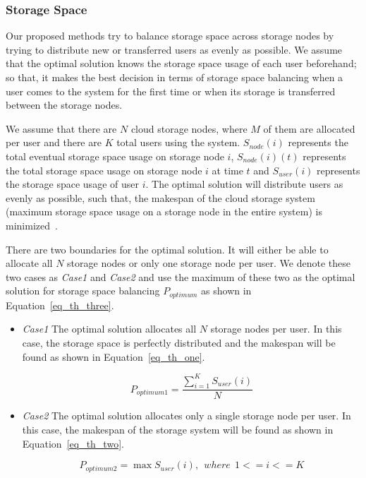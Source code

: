 \documentclass[preprint,12pt]{elsarticle}
\begin{document}
\subsubsection{Storage Space}
Our proposed methods try to balance storage space across storage nodes by trying to
distribute new or transferred users as evenly as possible. We assume that the optimal solution
knows the storage space usage of each user beforehand; so that, it makes the best decision in 
terms of storage space balancing when a user comes to the system for the first time or when its
storage is transferred between the storage nodes.

We assume that there are $N$ cloud storage nodes, where $M$ of them are allocated per user and
there are $K$ total users using the system. $S_{node}(i)$ represents the total eventual storage space
usage on storage node $i$, $S_{node}(i)(t)$ represents the total storage space usage
on storage node $i$ at time $t$ and $S_{user}(i)$ represents the storage space usage of user $i$. The optimal
solution will distribute users as evenly as possible, such that, the makespan of the cloud storage
system (maximum storage space usage on a storage node in the entire system) is minimized~\cite{tu_lecture}.

There are two boundaries for the optimal solution. It will either be able to allocate all $N$
storage nodes or only one storage node per user. We denote these two cases as \textit{Case1}
and \textit{Case2} and use the maximum of these two as the optimal solution for storage space balancing
$P_{optimum}$ as shown in Equation~\eqref{eq_th_three}.

\begin{itemize}
\item \textit{Case1} The optimal solution allocates all $N$ storage nodes per user. In this case,
the storage space is perfectly distributed and the makespan will be found as shown in Equation~\eqref{eq_th_one}.

\begin{equation}
P_{optimum1} = \frac{\sum\limits_{i=1}^{K} S_{user}(i)}{N}
\label{eq_th_one}
\end{equation}
\hfill

\item \textit{Case2} The optimal solution allocates only a single storage node per user. In this
case, the makespan of the storage system will be found as shown in Equation~\eqref{eq_th_two}.

\begin{equation}
P_{optimum2} = \max{S_{user}(i)},\ \ where\ \ 1 <= i <= K
\label{eq_th_two}
\end{equation}
\hfill
\end{itemize}
\end{document}

